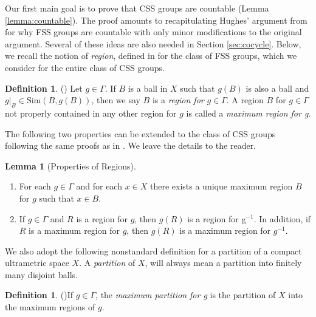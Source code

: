 \documentclass[12pt]{amsart}
\numberwithin{equation}{subsection}
\theoremstyle{definition}
\newtheorem{lemma}[theorem]{Lemma}
\theoremstyle{definition}
\newtheorem{definition}[theorem]{Definition}
\theoremstyle{remark}
\begin{document}
Our first main goal is to prove that CSS groups are countable (Lemma \ref{lemma:countable}). The proof amounts to recapitulating Hughes' argument from \cite{hughes2009} for why FSS groups are countable with only minor modifications to the original argument. Several of these ideas are also needed in Section \ref{sec:cocycle}. Below, we recall the notion of \emph{region}, defined in \cite{hughes2009} for the class of FSS groups, which we consider for the entire class of CSS groups. 



\begin{definition}(\cite[Definition 3.6]{hughes2009})
     Let $g \in \Gamma$. If $B$ is a ball in $X$ such that $g(B)$ is also a ball and $g\vert_B \in \text{Sim} (B, g(B))$, then we say $B$ is a \textit{region for} $g \in \Gamma$. A region $B$ for $g \in \Gamma$ not properly contained in any other region for $g$ is called a \textit{maximum region for g}. 
\end{definition}

The following two properties can be extended to the class of CSS groups following the same proofs as in \cite{hughes2009}. We leave the details to the reader. 

\begin{lemma}[Properties of Regions] \hspace{3 in}
    \begin{enumerate}
        \item \cite[Lemma 3.7]{hughes2009} For each $g \in \Gamma$ and for each $x \in X$ there exists a unique maximum region $B$ for $g$ such that $x \in B$.
        \item \cite[Lemma 3.9]{hughes2009} If $g \in \Gamma$ and $R$ is a region for $g$, then $g(R)$ is a region for g$^{-1}$. In addition, if $R$ is a maximum region for $g$, then $g(R)$ is a maximum region for $g^{-1}$.
    \end{enumerate}
\end{lemma}



We also adopt the following nonstandard definition for a partition of a compact ultrametric space $X$.  A \textit{partition} of $X$, will always mean a partition into finitely many disjoint balls. 

\begin{definition}(\cite[Definition 3.8]{hughes2009})\label{def:maxpart}
 If $g \in \Gamma$, the \textit{maximum partition for g} is the partition of $X$ into the maximum regions of $g$.
\end{definition}
\end{document}
